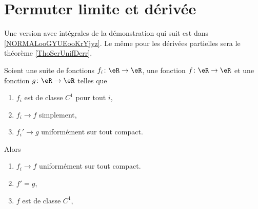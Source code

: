 \section{Permuter limite et dérivée}

Une version avec intégrales de la démonstration qui suit est dans \ref{NORMALooGYUEooKrYjyz}. Le même pour les dérivées partielles sera le théorème  \ref{ThoSerUnifDerr}.
\begin{theorem}     \label{THOooXZQCooSRteSr}
    Soient une suite de fonctions \( f_i\colon \eR\to \eR\), une fonction \( f\colon \eR\to \eR\) et une fonction \( g\colon \eR\to \eR\) telles que
    \begin{enumerate}
        \item
            \( f_i\) est de classe \( C^1\) pour tout \( i\),
        \item
            \( f_i\to f\) simplement,
        \item
            \( f_i'\to g\) uniformément sur tout compact.
    \end{enumerate}
    Alors
    \begin{enumerate}
        \item       \label{ITEMooYSWDooFFeQCd}
            \( f_i\to f\) uniformément sur tout compact.
        \item       \label{ITEMooFAWUooVQJPZh}
            \( f'=g\),
        \item
            \( f\) est de classe \( C^1\),
    \end{enumerate}
\end{theorem}

